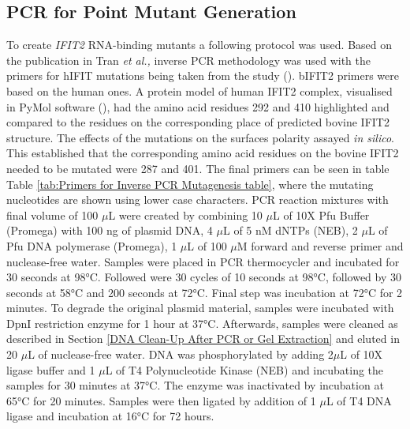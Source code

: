 \subsection{PCR for Point Mutant Generation} \label{subsec:PCR for Point Mutant Generation}
To create \textit{IFIT2} RNA-binding mutants a following protocol was used. Based on the publication in Tran \textit{et al.,} inverse PCR methodology was used with the primers for hIFIT mutations being taken from the study (\cite{Tran2020InfluenzaMRNAs}). bIFIT2 primers were based on the human ones. A protein model of human IFIT2 complex, visualised in PyMol software (\cite{SchrodingerTeam2023TheSystem}), had the amino acid residues 292 and 410 highlighted and compared to the residues on the corresponding place of predicted bovine IFIT2 structure. The effects of the mutations on the surfaces polarity assayed \textit{in silico}. This established that the corresponding amino acid residues on the bovine IFIT2 needed to be mutated were 287 and 401. The final primers can be seen in table Table \ref{tab:Primers for Inverse PCR Mutagenesis table}, where the mutating nucleotides are shown using lower case characters.
PCR reaction mixtures with final volume of 100 \(\mu\)L were created by combining 10 \(\mu\)L of 10X Pfu Buffer (Promega) with 100 ng of plasmid DNA, 4 \(\mu\)L of 5 nM dNTPs (NEB), 2 \(\mu\)L of Pfu DNA polymerase (Promega), 1 \(\mu\)L of 100 \(\mu\)M forward and reverse primer and nuclease-free water. Samples were placed in PCR thermocycler and incubated for 30 seconds at 98°C. Followed were 30 cycles of 10 seconds at 98°C, followed by 30 seconds at 58°C and 200 seconds at 72°C. Final step was incubation at 72°C for 2 minutes. To degrade the original plasmid material, samples were incubated with DpnI restriction enzyme for 1 hour at 37°C. Afterwards, samples were cleaned as described in Section \ref{DNA Clean-Up After PCR or Gel Extraction} and eluted in 20 \(\mu\)L of nuclease-free water. DNA was phosphorylated by adding 2\(\mu\)L of 10X ligase buffer and 1 \(\mu\)L of T4 Polynucleotide Kinase (NEB) and incubating the samples for 30 minutes at 37°C. The enzyme was inactivated by incubation at 65°C for 20 minutes. Samples were then ligated by addition of 1 \(\mu\)L of T4 DNA ligase and incubation at 16°C for 72 hours.

